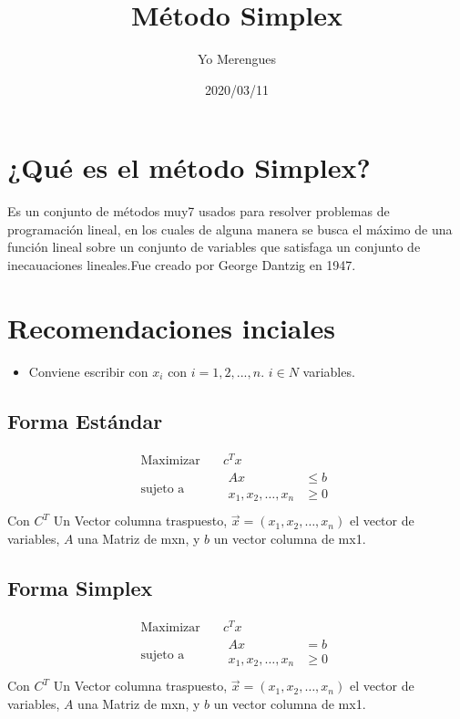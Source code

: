 \documentclass{article}
\title{Método Simplex}
\author{Yo Merengues}
\date{2020/03/11}
\begin{document}
\maketitle
\tableofcontents
\section{¿Qué es el método Simplex?}
Es un conjunto de métodos muy7 usados para resolver problemas de
programación lineal, en los cuales de alguna manera se busca el máximo
de una función lineal sobre un conjunto de variables que satisfaga un
conjunto de inecauaciones lineales.Fue creado por George Dantzig en 1947.
\section{Recomendaciones inciales}
\begin{itemize}
  \item Conviene escribir con $x_i$ con $i=1,2,...,n.$ $i\in N$ variables.
  \end{itemize}
  \subsection{Forma Estándar}
  \begin{equation*}
    \begin{aligned}
      \text{Maximizar} \quad & c^Tx\\
      \text{sujeto a} \quad &
      \begin{aligned}
      Ax &\leq b \\
      x_1,x_2,\ldots,x_n &\geq 0\\
    \end{aligned}
  \end{aligned}
\end{equation*}
Con $C^T$ Un Vector columna traspuesto, $\vec{x}=(x_1,x_2,\ldots,x_n)$
el vector de variables, $A$ una Matriz de mxn, y $b$ un vector columna
de mx1.
  \subsection{Forma Simplex}
  \begin{equation*}
    \begin{aligned}
      \text{Maximizar} \quad & c^Tx\\
      \text{sujeto a} \quad &
      \begin{aligned}
      Ax &=b \\
      x_1,x_2,\ldots,x_n &\geq 0\\
    \end{aligned}
  \end{aligned}
\end{equation*}
Con $C^T$ Un Vector columna traspuesto, $\vec{x}=(x_1,x_2,\ldots,x_n)$
el vector de variables, $A$ una Matriz de mxn, y $b$ un vector columna
de mx1.
\end{document}
